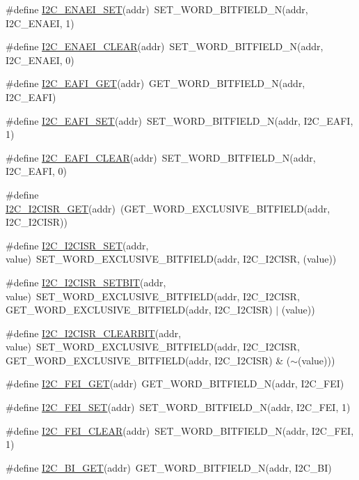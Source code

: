 \begin{DoxyCompactItemize}
\item 
\#define \hyperlink{a00557_ac6a0a1598876d35ee562e18d405ceb4c}{I2C\_\-ENAEI\_\-SET}(addr)~SET\_\-WORD\_\-BITFIELD\_\-N(addr, I2C\_\-ENAEI, 1)
\item 
\#define \hyperlink{a00557_a67d9effe2a18828a9bf120183cba35f1}{I2C\_\-ENAEI\_\-CLEAR}(addr)~SET\_\-WORD\_\-BITFIELD\_\-N(addr, I2C\_\-ENAEI, 0)
\item 
\#define \hyperlink{a00557_aae37b7f7c613083bae858762383eb06d}{I2C\_\-EAFI\_\-GET}(addr)~GET\_\-WORD\_\-BITFIELD\_\-N(addr, I2C\_\-EAFI)
\item 
\#define \hyperlink{a00557_a8f143ff62fb1f672ba84802986cca4c6}{I2C\_\-EAFI\_\-SET}(addr)~SET\_\-WORD\_\-BITFIELD\_\-N(addr, I2C\_\-EAFI, 1)
\item 
\#define \hyperlink{a00557_a7f98892ee9583b6fba1ea99464430fa1}{I2C\_\-EAFI\_\-CLEAR}(addr)~SET\_\-WORD\_\-BITFIELD\_\-N(addr, I2C\_\-EAFI, 0)
\item 
\#define \hyperlink{a00557_a8299b6ce82e25e6d8785b4f71b153673}{I2C\_\-I2CISR\_\-GET}(addr)~(GET\_\-WORD\_\-EXCLUSIVE\_\-BITFIELD(addr, I2C\_\-I2CISR))
\item 
\#define \hyperlink{a00557_a7c690454184cc937bd3a2a9408a466bc}{I2C\_\-I2CISR\_\-SET}(addr, value)~SET\_\-WORD\_\-EXCLUSIVE\_\-BITFIELD(addr, I2C\_\-I2CISR, (value))
\item 
\#define \hyperlink{a00557_a6f4cc69a3aab506bb5180fbda6a55074}{I2C\_\-I2CISR\_\-SETBIT}(addr, value)~SET\_\-WORD\_\-EXCLUSIVE\_\-BITFIELD(addr, I2C\_\-I2CISR, GET\_\-WORD\_\-EXCLUSIVE\_\-BITFIELD(addr, I2C\_\-I2CISR) $|$ (value))
\item 
\#define \hyperlink{a00557_a8f0a3ac0da5029d17c62098299ab18b0}{I2C\_\-I2CISR\_\-CLEARBIT}(addr, value)~SET\_\-WORD\_\-EXCLUSIVE\_\-BITFIELD(addr, I2C\_\-I2CISR, GET\_\-WORD\_\-EXCLUSIVE\_\-BITFIELD(addr, I2C\_\-I2CISR) \& ($\sim$(value)))
\item 
\#define \hyperlink{a00557_aebe4b3be48d93e354dfc9ff0ce43984d}{I2C\_\-FEI\_\-GET}(addr)~GET\_\-WORD\_\-BITFIELD\_\-N(addr, I2C\_\-FEI)
\item 
\#define \hyperlink{a00557_a9ab640cf4d737afa4340098f93780894}{I2C\_\-FEI\_\-SET}(addr)~SET\_\-WORD\_\-BITFIELD\_\-N(addr, I2C\_\-FEI, 1)
\item 
\#define \hyperlink{a00557_abae2f8bed5812e2bd247e60035186a24}{I2C\_\-FEI\_\-CLEAR}(addr)~SET\_\-WORD\_\-BITFIELD\_\-N(addr, I2C\_\-FEI, 1)
\item 
\#define \hyperlink{a00557_a11d88f82de4bc914a5fecbcc1b9a08ef}{I2C\_\-BI\_\-GET}(addr)~GET\_\-WORD\_\-BITFIELD\_\-N(addr, I2C\_\-BI)

\end{DoxyCompactItemize}
